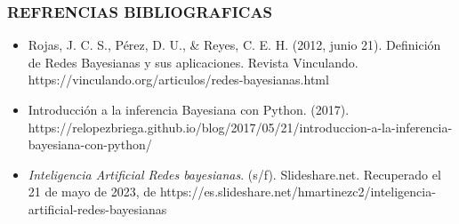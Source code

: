 \documentclass[
  letterpaper,
  DIV=11,
  numbers=noendperiod]{scrartcl}
\begin{document}
\hypertarget{refrencias-bibliograficas}{%
\subsubsection{REFRENCIAS
BIBLIOGRAFICAS}\label{refrencias-bibliograficas}}

\begin{itemize}
\item
  Rojas, J. C. S., Pérez, D. U., \& Reyes, C. E. H. (2012, junio 21).
  Definición de Redes Bayesianas y sus aplicaciones. Revista Vinculando.
  https://vinculando.org/articulos/redes-bayesianas.html
\item
  Introducción a la inferencia Bayesiana con Python. (2017).
  https://relopezbriega.github.io/blog/2017/05/21/introduccion-a-la-inferencia-bayesiana-con-python/
\item
  \emph{Inteligencia Artificial Redes bayesianas}. (s/f).
  Slideshare.net. Recuperado el 21 de mayo de 2023, de
  https://es.slideshare.net/hmartinezc2/inteligencia-artificial-redes-bayesianas
\end{itemize}
\end{document}
